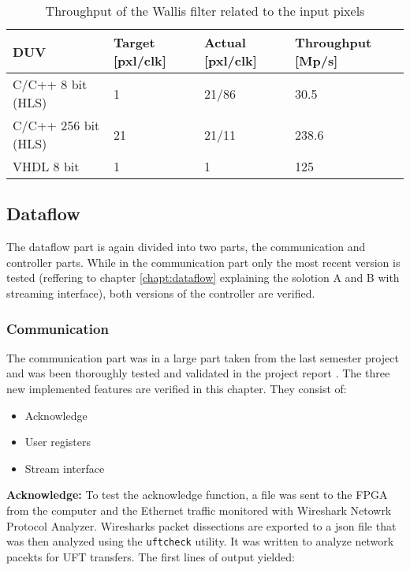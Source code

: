 \begin{table}[tb!]
    \centering
    \begin{tabular}{l l l l}
        \toprule
        DUV & Target [pxl/clk] & Actual [pxl/clk]  & Throughput [Mp/s]\\
        \midrule
        C/C++ 8 bit (HLS) & 1 & 21/86 & 30.5\\
        C/C++ 256 bit (HLS) & 21 & 21/11 & 238.6 \\
        VHDL 8 bit & 1 & 1 & 125 \\
        \bottomrule
    \end{tabular}
    \caption{Throughput of the Wallis filter related to the input pixels}
    \label{tab:throughput}
\end{table}


%
%
\subsection{Dataflow}\label{ch:verification:dataflow}
The dataflow part is again divided into two parts, the communication and
controller parts. While in the communication part only the most recent version
is tested (reffering to chapter \ref{chapt:dataflow} explaining the solotion
A and B with streaming interface), both versions of the controller are verified.

\subsubsection*{Communication}
The communication part was in a large part taken from the last semester project
and was been thoroughly tested and validated in the project report 
\cite{p5report}. The three new implemented features are verified in this
chapter. They consist of:
\begin{itemize}
    \item Acknowledge
    \item User registers
    \item Stream interface
\end{itemize}

\vspace{1ex}
\textbf{Acknowledge:} To test the acknowledge function, a file was sent to the
FPGA from the computer
and the Ethernet traffic monitored with Wireshark Netowrk Protocol Analyzer.
Wiresharks packet dissections are exported to a json file that was then analyzed
using the \texttt{uftcheck} utility. It was written to analyze network pacekts
for UFT transfers. The first lines of output yielded:

